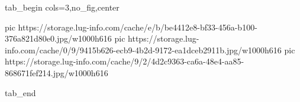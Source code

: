  
 
 
 
 


\ifcmt
  tab_begin cols=3,no_fig,center

     pic https://storage.lug-info.com/cache/e/b/be4412e8-bf33-456a-b100-376a821d80e0.jpg/w1000h616
		 pic https://storage.lug-info.com/cache/0/9/9415b626-ecb9-4b2d-9172-ea1dceb2911b.jpg/w1000h616
		 pic https://storage.lug-info.com/cache/9/2/4d2c9363-ca6a-48e4-aa85-868671fef214.jpg/w1000h616

  tab_end
\fi
